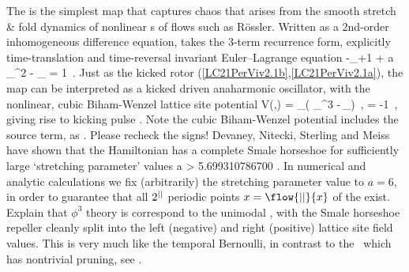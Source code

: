 The {\HenonMap} is the simplest map that captures chaos that arises from
the smooth stretch \& fold dynamics of nonlinear {\PoincMap}s of flows
such as R\"ossler.
Written as a  2nd-order inhomogeneous difference equation,
 takes the
{\em \henlatt} 3-term recurrence form, explicitly time-translation
and time-reversal invariant Euler–Lagrange equation
\beq
-\ssp_{\zeit+1} + {a}\,\ssp_{\zeit}^2 - \ssp_{} = 1
\,.
Just as the kicked rotor (\ref{LC21PerViv2.1b},\ref{LC21PerViv2.1a}), the map can
be interpreted as a kicked driven anaharmonic oscillator,
with the nonlinear, cubic Biham-Wenzel lattice site potential
\beq
V(\Xx,\Mm) = \sum_{\zeit\in\lattice}\left(
\ssp_{\zeit}^3 -\Ssym{\zeit}\,\ssp_\zeit\right)
    \,,\qquad
        \Ssym{\zeit} = -1
\,,
giving rise to kicking pulse .
     {
Note the cubic Biham-Wenzel potential includes
the source term, as  .
Please recheck the signs!
    }
Devaney, Nitecki, Sterling and Meiss
have shown that the Hamiltonian {\HenonMap} has a complete Smale
horseshoe for sufficiently large `stretching parameter' values
\beq
      a > 5.699310786700\cdots
\;.
In numerical and analytic calculations we fix
(arbitrarily) the stretching parameter value to $a=6$, in order to
guarantee that all $2^{||}$ periodic points  $\ssp=\flow{\cl{}}{\ssp}$
of the {\HenonMap}  exist.
     {
Explain that $\phi^3$ theory is correspond to the unimodal \henlatt, with
the Smale horseshoe repeller cleanly split into the left (negative) and
right (positive) lattice site field values.
This is very much like the temporal Bernoulli, in contrast to the
\templatt\ which has nontrivial pruning, see .
    }

